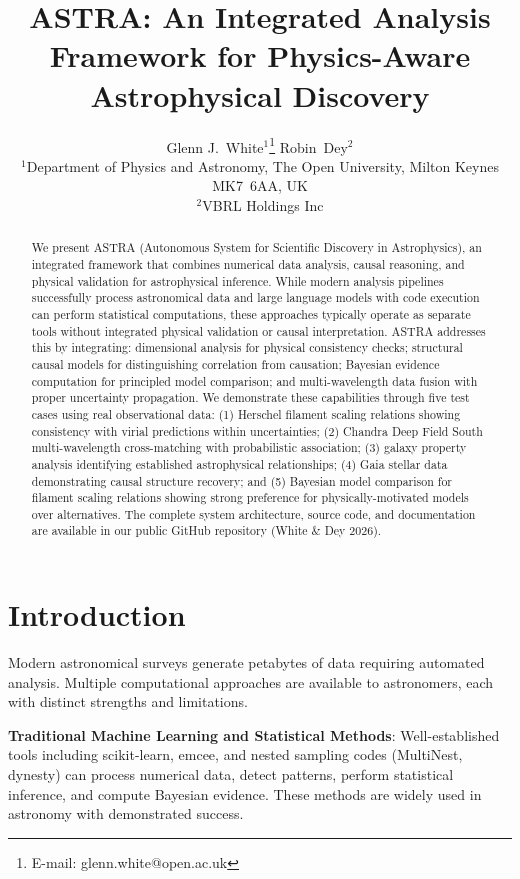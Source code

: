 \documentclass[usenatbib]{rasti}
\title[ASTRA: Integrated Analysis Framework for Astrophysics]{ASTRA: An Integrated Analysis Framework for Physics-Aware Astrophysical Discovery}
\author[White \& Dey]{
Glenn J.~White$^{1}$\thanks{E-mail: glenn.white@open.ac.uk}
Robin~Dey$^{2}$\\
$^{1}$Department of Physics and Astronomy, The Open University, Milton Keynes MK7~6AA, UK\\
$^{2}$VBRL Holdings Inc
}
\begin{document}

\maketitle

\label{firstpage}

\begin{abstract}
We present ASTRA (Autonomous System for Scientific Discovery in Astrophysics), an integrated framework that combines numerical data analysis, causal reasoning, and physical validation for astrophysical inference. While modern analysis pipelines successfully process astronomical data and large language models with code execution can perform statistical computations, these approaches typically operate as separate tools without integrated physical validation or causal interpretation. ASTRA addresses this by integrating: dimensional analysis for physical consistency checks; structural causal models for distinguishing correlation from causation; Bayesian evidence computation for principled model comparison; and multi-wavelength data fusion with proper uncertainty propagation. We demonstrate these capabilities through five test cases using real observational data: (1) Herschel filament scaling relations showing consistency with virial predictions within uncertainties; (2) Chandra Deep Field South multi-wavelength cross-matching with probabilistic association; (3) galaxy property analysis identifying established astrophysical relationships; (4) Gaia stellar data demonstrating causal structure recovery; and (5) Bayesian model comparison for filament scaling relations showing strong preference for physically-motivated models over alternatives. The complete system architecture, source code, and documentation are available in our public GitHub repository (White \& Dey 2026)\cite{astra_github}.
\end{abstract}

\section{Introduction}

Modern astronomical surveys generate petabytes of data requiring automated analysis. Multiple computational approaches are available to astronomers, each with distinct strengths and limitations.

\textbf{Traditional Machine Learning and Statistical Methods}: Well-established tools including scikit-learn, emcee, and nested sampling codes (MultiNest, dynesty) can process numerical data, detect patterns, perform statistical inference, and compute Bayesian evidence. These methods are widely used in astronomy with demonstrated success.
\end{document}
